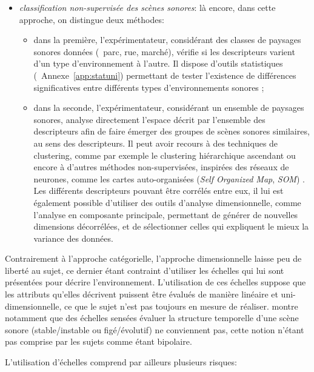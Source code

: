 \begin{itemize}
\item \emph{classification non-supervisée des scènes sonores}: là encore, dans cette approche, on distingue deux méthodes:

\begin{itemize}
\item dans la première, l'expérimentateur, considérant des classes de paysages sonores données (\eg~parc, rue, marché), vérifie si les descripteurs varient d'un type d'environnement à l'autre. Il dispose d'outils statistiques (\cf~Annexe~\ref{app:statuni}) permettant de tester l'existence de différences significatives entre différents types d'environnements sonores \citep{hong2013designing};
\item dans la seconde, l'expérimentateur, considérant un ensemble de paysages sonores, analyse directement l'espace décrit par l'ensemble des descripteurs afin de faire émerger des groupes de scènes sonores similaires, au sens des descripteurs. Il peut avoir recours à des techniques de clustering, comme par exemple le clustering hiérarchique ascendant \citep{torija2013application} ou encore à d'autres méthodes non-supervisées, inspirées des réseaux de neurones, comme les cartes auto-organisées (\emph{Self Organized Map}, \emph{SOM}) \citep{ricciardi2015sound}. Les différents descripteurs pouvant être corrélés entre eux, il lui est également possible d'utiliser des outils d'analyse dimensionnelle, comme l'analyse en composante principale, permettant de générer de nouvelles dimensions décorrélées, et de sélectionner celles qui expliquent le mieux la variance des données.
\end{itemize}

\end{itemize}

Contrairement à l'approche catégorielle, l'approche dimensionnelle laisse peu de liberté au sujet, ce dernier étant contraint d'utiliser les échelles qui lui sont présentées pour décrire l'environnement. L'utilisation de ces échelles suppose que les attributs qu'elles décrivent puissent être évalués de manière linéaire et uni-dimensionnelle, ce que le sujet n'est pas toujours en mesure de réaliser. \citep{raimbault2006qualitative} montre notamment que des échelles sensées évaluer la structure temporelle d'une scène sonore (stable/instable ou figé/évolutif) ne conviennent pas, cette notion n'étant pas comprise par les sujets comme étant bipolaire.

L'utilisation d'échelles comprend par ailleurs plusieurs risques:

